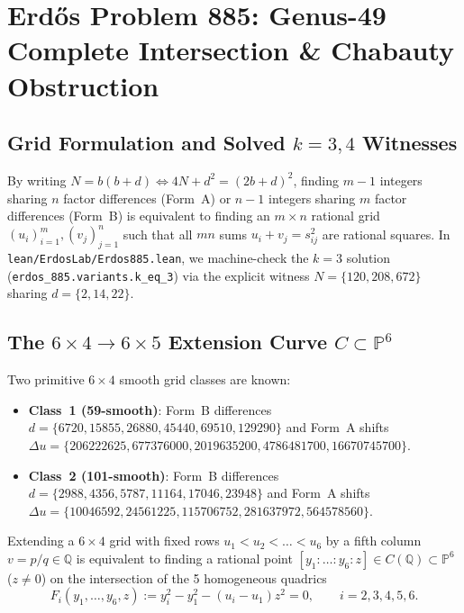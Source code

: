 \documentclass[10pt,twocolumn]{article}
\theoremstyle{definition}
\begin{document}
\section{Erd\H{o}s Problem 885: Genus-49 Complete Intersection \& Chabauty Obstruction}

\subsection{Grid Formulation and Solved $k=3, 4$ Witnesses}
By writing $N = b(b+d) \iff 4N + d^2 = (2b+d)^2$, finding $m-1$ integers sharing $n$ factor differences (Form~A) or $n-1$ integers sharing $m$ factor differences (Form~B) is equivalent to finding an $m \times n$ rational grid $(u_i)_{i=1}^m, (v_j)_{j=1}^n$ such that all $mn$ sums $u_i + v_j = s_{ij}^2$ are rational squares. In \texttt{lean/ErdosLab/Erdos885.lean}, we machine-check the $k=3$ solution (\texttt{erdos\_885.variants.k\_eq\_3}) via the explicit witness $N = \{120, 208, 672\}$ sharing $d = \{2, 14, 22\}$.

\subsection{The $6 \times 4 \to 6 \times 5$ Extension Curve $C \subset \mathbb{P}^6$}
Two primitive $6 \times 4$ smooth grid classes are known:
\begin{itemize}[leftmargin=1.4em,itemsep=1pt]
  \item \textbf{Class~1 (59-smooth)}: Form~B differences $d = \{6720, 15855, 26880, 45440, 69510, 129290\}$ and Form~A shifts $\Delta u = \{206222625, 677376000, 2019635200, 4786481700, 16670745700\}$.
  \item \textbf{Class~2 (101-smooth)}: Form~B differences $d = \{2988, 4356, 5787, 11164, 17046, 23948\}$ and Form~A shifts $\Delta u = \{10046592, 24561225, 115706752, 281637972, 564578560\}$.
\end{itemize}
Extending a $6 \times 4$ grid with fixed rows $u_1 < u_2 < \dots < u_6$ by a fifth column $v = p/q \in \mathbb{Q}$ is equivalent to finding a rational point $[y_1 : \dots : y_6 : z] \in C(\mathbb{Q}) \subset \mathbb{P}^6$ ($z \neq 0$) on the intersection of the 5 homogeneous quadrics
\begin{equation}
  F_i(y_1,\dots,y_6,z) := y_i^2 - y_1^2 - (u_i - u_1)z^2 = 0, \qquad i = 2, 3, 4, 5, 6.
\end{equation}
\end{document}
